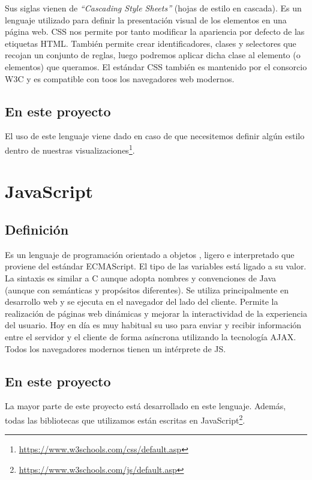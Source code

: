 \documentclass[a4paper, 12pt]{book}
\begin{document}
Sus siglas vienen de \textit{“Cascading Style Sheets”} (hojas de estilo en cascada)\cite{gasston:_cssguide}. Es un lenguaje utilizado para definir la presentación visual de los elementos en una página web. CSS nos permite por tanto modificar la apariencia por defecto de las etiquetas HTML. También permite crear identificadores, clases y selectores que recojan un conjunto de reglas, luego podremos aplicar dicha clase al elemento (o elementos) que queramos. El estándar CSS también es mantenido por el consorcio W3C y es compatible con toos los navegadores web modernos.

\subsection{En este proyecto}

El uso de este lenguaje viene dado en caso de que necesitemos definir algún estilo dentro de nuestras visualizaciones\footnote{\url{https://www.w3schools.com/css/default.asp}}.


\section{JavaScript}
\label{sec:js}
\subsection{Definición}
Es un lenguaje de programación orientado a objetos \cite{flanagan:_jsguide}, ligero e interpretado que proviene del estándar ECMAScript.  El tipo de las variables está ligado a su valor. La sintaxis es similar a C aunque adopta nombres y convenciones de Java (aunque con semánticas y propósitos diferentes). Se utiliza principalmente en desarrollo web y se ejecuta en el navegador del lado del cliente. Permite la realización de páginas web dinámicas y mejorar la interactividad de la experiencia del usuario. Hoy en día es muy habitual su uso para enviar y recibir información entre el servidor y el cliente de forma asíncrona utilizando la tecnología AJAX. Todos los navegadores modernos tienen un intérprete de JS.

\subsection{En este proyecto}

La mayor parte de este proyecto está desarrollado en este lenguaje. Además, todas las bibliotecas que utilizamos están escritas en JavaScript\footnote{\url{https://www.w3schools.com/js/default.asp}}.
\end{document}
